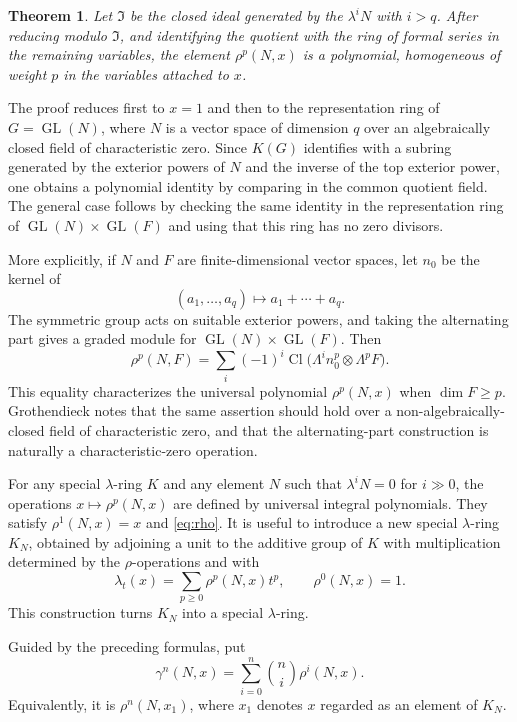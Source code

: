 \documentclass[14pt]{extarticle}
\newcommand{\Cl}{\operatorname{Cl}}
\newcommand{\GL}{\operatorname{GL}}
\newtheorem*{theorem*}{Theorem}
\begin{document}
\begin{theorem*}
Let $\mathfrak I$ be the closed ideal generated by the $\lambda^iN$ with $i>q$. After reducing modulo $\mathfrak I$, and identifying the quotient with the ring of formal series in the remaining variables, the element $\rho^p(N,x)$ is a polynomial, homogeneous of weight $p$ in the variables attached to $x$.
\end{theorem*}

The proof reduces first to $x=1$ and then to the representation ring of $G=\GL(N)$, where $N$ is a vector space of dimension $q$ over an algebraically closed field of characteristic zero. Since $K(G)$ identifies with a subring generated by the exterior powers of $N$ and the inverse of the top exterior power, one obtains a polynomial identity by comparing in the common quotient field. The general case follows by checking the same identity in the representation ring of $\GL(N)\times\GL(F)$ and using that this ring has no zero divisors.

More explicitly, if $N$ and $F$ are finite-dimensional vector spaces, let $n_0$ be the kernel of
\[
   (a_1,\ldots,a_q)\longmapsto a_1+\cdots+a_q.
\]
The symmetric group acts on suitable exterior powers, and taking the alternating part gives a graded module for $\GL(N)\times\GL(F)$. Then
\begin{equation}\label{eq:rhoalternating}
   \rho^p(N,F)=\sum_i(-1)^i
      \Cl\bigl(\Lambda^i n_0^p\otimes\Lambda^pF\bigr).
\end{equation}
This equality characterizes the universal polynomial $\rho^p(N,x)$ when $\dim F\geq p$. Grothendieck notes that the same assertion should hold over a non-algebraically-closed field of characteristic zero, and that the alternating-part construction is naturally a characteristic-zero operation.

For any special $\lambda$-ring $K$ and any element $N$ such that $\lambda^iN=0$ for $i\gg0$, the operations $x\mapsto\rho^p(N,x)$ are defined by universal integral polynomials. They satisfy $\rho^1(N,x)=x$ and \eqref{eq:rho}. It is useful to introduce a new special $\lambda$-ring $K_N$, obtained by adjoining a unit to the additive group of $K$ with multiplication determined by the $\rho$-operations and with
\[
   \lambda_t(x)=\sum_{p\geq0}\rho^p(N,x)t^p,
   \qquad \rho^0(N,x)=1.
\]
This construction turns $K_N$ into a special $\lambda$-ring.

Guided by the preceding formulas, put
\begin{equation}\label{eq:gammarho}
   \gamma^n(N,x)=\sum_{i=0}^n\binom{n}{i}\rho^i(N,x).
\end{equation}
Equivalently, it is $\rho^n(N,x_1)$, where $x_1$ denotes $x$ regarded as an element of $K_N$.
\end{document}
